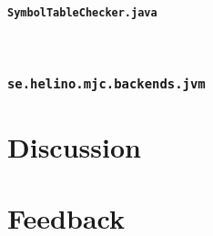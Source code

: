 \documentclass[11pt,oneside,a4paper]{article}
\begin{document}
\paragraph{\texttt{SymbolTableChecker.java}} \hfill \\

\subsubsection{\texttt{se.helino.mjc.backends.jvm}}

\section{Discussion}
\label{sec:discussion}

\appendix
\section{Feedback}
\end{document}
